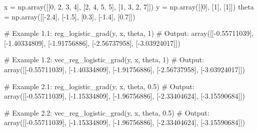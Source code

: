 \documentclass[]{article}
\newenvironment{Shaded}{\begin{snugshade}}{\end{snugshade}}
\newcommand{\CommentTok}[1]{\textcolor[rgb]{0.48,0.49,0.49}{#1}}
\newcommand{\DecValTok}[1]{\textcolor[rgb]{0.96,0.45,0.00}{#1}}
\newcommand{\FloatTok}[1]{\textcolor[rgb]{0.96,0.45,0.00}{#1}}
\newcommand{\NormalTok}[1]{\textcolor[rgb]{0.81,0.81,0.76}{#1}}
\newcommand{\OperatorTok}[1]{\textcolor[rgb]{0.81,0.81,0.76}{#1}}
\begin{document}
\begin{Shaded}
\begin{Highlighting}[]
\NormalTok{x }\OperatorTok{=}\NormalTok{ np.array([[}\DecValTok{0}\NormalTok{, }\DecValTok{2}\NormalTok{, }\DecValTok{3}\NormalTok{, }\DecValTok{4}\NormalTok{], }
\NormalTok{              [}\DecValTok{2}\NormalTok{, }\DecValTok{4}\NormalTok{, }\DecValTok{5}\NormalTok{, }\DecValTok{5}\NormalTok{], }
\NormalTok{              [}\DecValTok{1}\NormalTok{, }\DecValTok{3}\NormalTok{, }\DecValTok{2}\NormalTok{, }\DecValTok{7}\NormalTok{]])}
\NormalTok{y }\OperatorTok{=}\NormalTok{ np.array([[}\DecValTok{0}\NormalTok{], [}\DecValTok{1}\NormalTok{], [}\DecValTok{1}\NormalTok{]])}
\NormalTok{theta }\OperatorTok{=}\NormalTok{ np.array([[}\OperatorTok{-}\FloatTok{2.4}\NormalTok{], [}\OperatorTok{-}\FloatTok{1.5}\NormalTok{], [}\FloatTok{0.3}\NormalTok{], [}\OperatorTok{-}\FloatTok{1.4}\NormalTok{], [}\FloatTok{0.7}\NormalTok{]])}

\CommentTok{# Example 1.1:}
\NormalTok{reg_logistic_grad(y, x, theta, }\DecValTok{1}\NormalTok{)}
\CommentTok{# Output:}
\NormalTok{array([[}\OperatorTok{-}\FloatTok{0.55711039}\NormalTok{],}
\NormalTok{       [}\OperatorTok{-}\FloatTok{1.40334809}\NormalTok{],}
\NormalTok{       [}\OperatorTok{-}\FloatTok{1.91756886}\NormalTok{],}
\NormalTok{       [}\OperatorTok{-}\FloatTok{2.56737958}\NormalTok{],}
\NormalTok{       [}\OperatorTok{-}\FloatTok{3.03924017}\NormalTok{]])}

\CommentTok{# Example 1.2:}
\NormalTok{vec_reg_logistic_grad(y, x, theta, }\DecValTok{1}\NormalTok{)}
\CommentTok{# Output:}
\NormalTok{array([[}\OperatorTok{-}\FloatTok{0.55711039}\NormalTok{],}
\NormalTok{       [}\OperatorTok{-}\FloatTok{1.40334809}\NormalTok{],}
\NormalTok{       [}\OperatorTok{-}\FloatTok{1.91756886}\NormalTok{],}
\NormalTok{       [}\OperatorTok{-}\FloatTok{2.56737958}\NormalTok{],}
\NormalTok{       [}\OperatorTok{-}\FloatTok{3.03924017}\NormalTok{]])}

\CommentTok{# Example 2.1:}
\NormalTok{reg_logistic_grad(y, x, theta, }\FloatTok{0.5}\NormalTok{)}
\CommentTok{# Output:}
\NormalTok{array([[}\OperatorTok{-}\FloatTok{0.55711039}\NormalTok{],}
\NormalTok{       [}\OperatorTok{-}\FloatTok{1.15334809}\NormalTok{],}
\NormalTok{       [}\OperatorTok{-}\FloatTok{1.96756886}\NormalTok{],}
\NormalTok{       [}\OperatorTok{-}\FloatTok{2.33404624}\NormalTok{],}
\NormalTok{       [}\OperatorTok{-}\FloatTok{3.15590684}\NormalTok{]])}

\CommentTok{# Example 2.2:}
\NormalTok{vec_reg_logistic_grad(y, x, theta, }\FloatTok{0.5}\NormalTok{)}
\CommentTok{# Output:}
\NormalTok{array([[}\OperatorTok{-}\FloatTok{0.55711039}\NormalTok{],}
\NormalTok{       [}\OperatorTok{-}\FloatTok{1.15334809}\NormalTok{],}
\NormalTok{       [}\OperatorTok{-}\FloatTok{1.96756886}\NormalTok{],}
\NormalTok{       [}\OperatorTok{-}\FloatTok{2.33404624}\NormalTok{],}
\NormalTok{       [}\OperatorTok{-}\FloatTok{3.15590684}\NormalTok{]])}


\end{Highlighting}
\end{Shaded}
\end{document}
